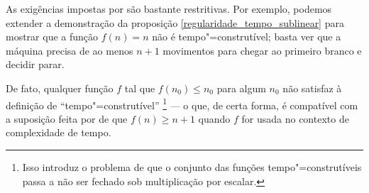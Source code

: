 As exigências impostas por 
são bastante restritivas.
Por exemplo,
podemos extender a demonstração da proposição
\ref{regularidade_tempo_sublinear}
para mostrar que a função $f(n) = n$
não é tempo"=construtível;
basta ver que a máquina precisa de ao menos $n+1$ movimentos
para chegar ao primeiro branco e decidir parar.

De fato, qualquer função $f$ tal que $f(n_0) \leq n_0$ para algum $n_0$
não satisfaz à definição de ``tempo"=construtível''
\footnote{
    Isso introduz o problema de que o conjunto das funções tempo"=construtíveis
    passa a não ser fechado sob multiplicação por escalar.
}
--- o que, de certa forma,
é compatível com a suposição feita por 
de que $f(n) \geq n+1$
quando $f$ for usada no contexto de complexidade de tempo.
